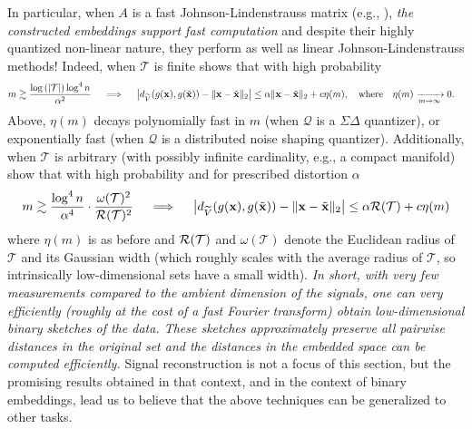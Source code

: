 In particular, when $A$ is a fast Johnson-Lindenstrauss matrix (e.g., \cite{ailon2009fast}), \emph{the constructed embeddings support fast computation} and despite their highly quantized non-linear nature, they perform as well as linear Johnson-Lindenstrauss methods! %
{Indeed, when $\mathcal{T}$ is finite} \cite{huynh2018fast} shows that with high probability %
\begin{align*} m \gtrsim \frac{\log{(|\mathcal{T}|)} \log^4 n}{\alpha^2} \quad \implies  \quad \big|d_{\widetilde{V}}(g(\mathbf{x}), g(\tilde{\mathbf{x}})) - \|\mathbf{x} - \tilde{\mathbf{x}}\|_2\big| & \leq {\alpha}\|\mathbf{x} - \tilde{\mathbf{x}}\|_2 + c\eta(m),  \quad\text{where} \quad \eta(m) \xrightarrow[m \rightarrow \infty]{} 0. \end{align*}
Above, $\eta(m)$ decays polynomially fast in $m$ (when $\mathcal{Q}$ is a $\Sigma\Delta$ quantizer), or exponentially fast (when $\mathcal{Q}$ is a distributed noise shaping quantizer). %
{Additionally, when $\mathcal{T}$ is arbitrary (with possibly infinite cardinality, e.g., a compact manifold)} \cite{huynh2018fast} show that with high probability  and for prescribed distortion $\alpha$
\[ m \gtrsim \frac{\log^4 n}{\alpha^4}\cdot\frac{\omega(\mathcal{T})^2}{\mathcal{R}(\mathcal{T})^2} \quad \implies \quad \big|d_{\widetilde{V}}(g(\mathbf{x}), g(\tilde{\mathbf{x}})) - \|\mathbf{x} - \tilde{\mathbf{x}}\|_2\big| \leq \alpha \mathcal{R}(\mathcal{T}) + c\eta(m)\]
where $\eta(m)$ is as before and  $\mathcal{R}(\mathcal{T})$ and $\omega(\mathcal{T})$ denote  the Euclidean radius of  $\mathcal{T}$ and its Gaussian width (which roughly scales with the average radius of $\mathcal{T}$, so  intrinsically low-dimensional sets have a small  width). %
 \emph{In short, with \emph{very few measurements} compared to the ambient dimension of the signals, one can very efficiently (roughly at the cost of a fast Fourier transform) obtain low-dimensional binary sketches of the data. These sketches approximately preserve all pairwise distances in the original set and the distances in the embedded space can be computed efficiently.}
Signal reconstruction is not a focus of this section, but the promising results obtained in that context, and in the context of binary embeddings, lead us to believe that the above techniques can be generalized to other tasks. 

